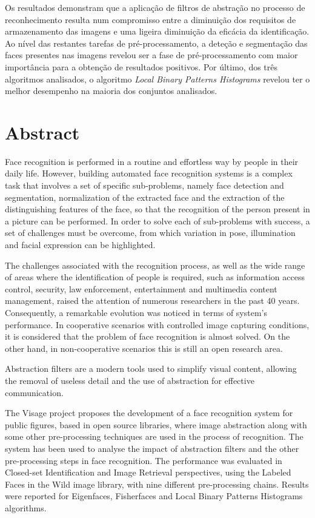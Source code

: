 Os resultados demonstram que a aplicação de filtros de abstração no processo de reconhecimento resulta num compromisso entre a diminuição dos requisitos de armazenamento das imagens e uma ligeira diminuição da eficácia da identificação. Ao nível das restantes tarefas de pré-processamento, a deteção e segmentação das faces presentes nas imagens revelou ser a fase de pré-processamento com maior importância para a obtenção de resultados positivos. Por último, dos três algoritmos analisados, o algoritmo \textit{Local Binary Patterns Histograms} revelou ter o melhor desempenho na maioria dos conjuntos analisados.

\chapter*{Abstract}
Face recognition is performed in a routine and effortless way by people in their daily life. However, building automated face recognition systems is a complex task that involves a set of specific sub-problems, namely face detection and segmentation, normalization of the extracted face and the extraction of the distinguishing features of the face, so that the recognition of the person present in a picture can be performed. In order to solve each of sub-problems with success, a set of challenges must be overcome, from which variation in pose, illumination and facial expression can be highlighted.

The challenges associated with the recognition process, as well as the wide range of areas where the identification of people is required, such as information access control, security, law enforcement, entertainment and multimedia content management, raised the attention of numerous researchers in the past 40 years. Consequently, a remarkable evolution was noticed in terms of system's performance. In cooperative scenarios with controlled image capturing conditions, it is considered that the problem of face recognition is almost solved. On the other hand,  in non-cooperative scenarios this is still an open research area.

Abstraction filters are a modern tools used to simplify visual content, allowing the removal of useless detail and the use of abstraction for effective communication.

The Visage project proposes the development of a face recognition system for public figures, based in open source libraries, where image abstraction along with some other pre-processing techniques are used in the process of recognition. The system has been used to analyse the impact of abstraction filters and the other pre-processing steps in face recognition. The performance was evaluated in Closed-set Identification and Image Retrieval perspectives, using the Labeled Faces in the Wild image library, with nine different pre-processing chains. Results were reported for Eigenfaces, Fisherfaces and Local Binary Patterns Histograms algorithms.

